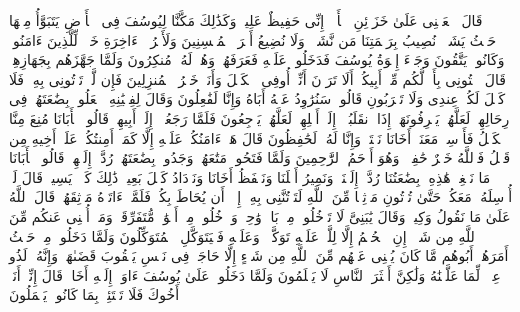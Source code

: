 \startbuffer[\q:12:55]
قَالَ ٱجۡعَلۡنِی عَلَىٰ خَزَاۤئِنِ ٱلۡأَرۡضِۖ إِنِّی حَفِیظٌ عَلِیمࣱ%
\stopbuffer%
\startbuffer[\q:12:56]
وَكَذَٰلِكَ مَكَّنَّا لِیُوسُفَ فِی ٱلۡأَرۡضِ یَتَبَوَّأُ مِنۡهَا حَیۡثُ یَشَاۤءُۚ نُصِیبُ بِرَحۡمَتِنَا مَن نَّشَاۤءُۖ وَلَا نُضِیعُ أَجۡرَ ٱلۡمُحۡسِنِینَ%
\stopbuffer%
\startbuffer[\q:12:57]
وَلَأَجۡرُ ٱلۡءَاخِرَةِ خَیۡرࣱ لِّلَّذِینَ ءَامَنُوا۟ وَكَانُوا۟ یَتَّقُونَ%
\stopbuffer%
\startbuffer[\q:12:58]
وَجَاۤءَ إِخۡوَةُ یُوسُفَ فَدَخَلُوا۟ عَلَیۡهِ فَعَرَفَهُمۡ وَهُمۡ لَهُۥ مُنكِرُونَ%
\stopbuffer%
\startbuffer[\q:12:59]
وَلَمَّا جَهَّزَهُم بِجَهَازِهِمۡ قَالَ ٱئۡتُونِی بِأَخࣲ لَّكُم مِّنۡ أَبِیكُمۡۚ أَلَا تَرَوۡنَ أَنِّیۤ أُوفِی ٱلۡكَیۡلَ وَأَنَا۠ خَیۡرُ ٱلۡمُنزِلِینَ%
\stopbuffer%
\startbuffer[\q:12:60]
فَإِن لَّمۡ تَأۡتُونِی بِهِۦ فَلَا كَیۡلَ لَكُمۡ عِندِی وَلَا تَقۡرَبُونِ%
\stopbuffer%
\startbuffer[\q:12:61]
قَالُوا۟ سَنُرَٰوِدُ عَنۡهُ أَبَاهُ وَإِنَّا لَفَٰعِلُونَ%
\stopbuffer%
\startbuffer[\q:12:62]
وَقَالَ لِفِتۡیَٰنِهِ ٱجۡعَلُوا۟ بِضَٰعَتَهُمۡ فِی رِحَالِهِمۡ لَعَلَّهُمۡ یَعۡرِفُونَهَاۤ إِذَا ٱنقَلَبُوۤا۟ إِلَىٰۤ أَهۡلِهِمۡ لَعَلَّهُمۡ یَرۡجِعُونَ%
\stopbuffer%
\startbuffer[\q:12:63]
فَلَمَّا رَجَعُوۤا۟ إِلَىٰۤ أَبِیهِمۡ قَالُوا۟ یَٰۤأَبَانَا مُنِعَ مِنَّا ٱلۡكَیۡلُ فَأَرۡسِلۡ مَعَنَاۤ أَخَانَا نَكۡتَلۡ وَإِنَّا لَهُۥ لَحَٰفِظُونَ%
\stopbuffer%
\startbuffer[\q:12:64]
قَالَ هَلۡ ءَامَنُكُمۡ عَلَیۡهِ إِلَّا كَمَاۤ أَمِنتُكُمۡ عَلَىٰۤ أَخِیهِ مِن قَبۡلُ فَٱللَّهُ خَیۡرٌ حَٰفِظࣰاۖ وَهُوَ أَرۡحَمُ ٱلرَّٰحِمِینَ%
\stopbuffer%
\startbuffer[\q:12:65]
وَلَمَّا فَتَحُوا۟ مَتَٰعَهُمۡ وَجَدُوا۟ بِضَٰعَتَهُمۡ رُدَّتۡ إِلَیۡهِمۡۖ قَالُوا۟ یَٰۤأَبَانَا مَا نَبۡغِیۖ هَٰذِهِۦ بِضَٰعَتُنَا رُدَّتۡ إِلَیۡنَاۖ وَنَمِیرُ أَهۡلَنَا وَنَحۡفَظُ أَخَانَا وَنَزۡدَادُ كَیۡلَ بَعِیرࣲۖ ذَٰلِكَ كَیۡلࣱ یَسِیرࣱ%
\stopbuffer%
\startbuffer[\q:12:66]
قَالَ لَنۡ أُرۡسِلَهُۥ مَعَكُمۡ حَتَّىٰ تُؤۡتُونِ مَوۡثِقࣰا مِّنَ ٱللَّهِ لَتَأۡتُنَّنِی بِهِۦۤ إِلَّاۤ أَن یُحَاطَ بِكُمۡۖ فَلَمَّاۤ ءَاتَوۡهُ مَوۡثِقَهُمۡ قَالَ ٱللَّهُ عَلَىٰ مَا نَقُولُ وَكِیلࣱ%
\stopbuffer%
\startbuffer[\q:12:67]
وَقَالَ یَٰبَنِیَّ لَا تَدۡخُلُوا۟ مِنۢ بَابࣲ وَٰحِدࣲ وَٱدۡخُلُوا۟ مِنۡ أَبۡوَٰبࣲ مُّتَفَرِّقَةࣲۖ وَمَاۤ أُغۡنِی عَنكُم مِّنَ ٱللَّهِ مِن شَیۡءٍۖ إِنِ ٱلۡحُكۡمُ إِلَّا لِلَّهِۖ عَلَیۡهِ تَوَكَّلۡتُۖ وَعَلَیۡهِ فَلۡیَتَوَكَّلِ ٱلۡمُتَوَكِّلُونَ%
\stopbuffer%
\startbuffer[\q:12:68]
وَلَمَّا دَخَلُوا۟ مِنۡ حَیۡثُ أَمَرَهُمۡ أَبُوهُم مَّا كَانَ یُغۡنِی عَنۡهُم مِّنَ ٱللَّهِ مِن شَیۡءٍ إِلَّا حَاجَةࣰ فِی نَفۡسِ یَعۡقُوبَ قَضَىٰهَاۚ وَإِنَّهُۥ لَذُو عِلۡمࣲ لِّمَا عَلَّمۡنَٰهُ وَلَٰكِنَّ أَكۡثَرَ ٱلنَّاسِ لَا یَعۡلَمُونَ%
\stopbuffer%
\startbuffer[\q:12:69]
وَلَمَّا دَخَلُوا۟ عَلَىٰ یُوسُفَ ءَاوَىٰۤ إِلَیۡهِ أَخَاهُۖ قَالَ إِنِّیۤ أَنَا۠ أَخُوكَ فَلَا تَبۡتَئِسۡ بِمَا كَانُوا۟ یَعۡمَلُونَ%
